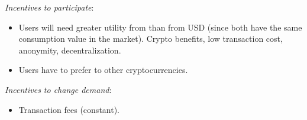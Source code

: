 \noindent \emph{Incentives to participate}:
\begin{itemize}
\item{Users will need greater utility from \NOM{} than from USD (since both have the same consumption value in the market). Crypto benefits, low transaction cost, anonymity, decentralization.}
\item{Users have to prefer \NOM{} to other cryptocurrencies.}
\end{itemize}
 
\noindent \emph{Incentives to change demand}: 
\begin{itemize}
\item{Transaction fees (constant).}
\end{itemize}

\newpage
